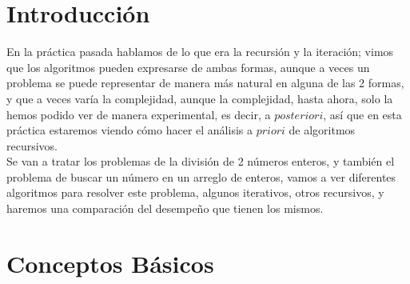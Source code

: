 \documentclass[12pt,twoside]{article}
\begin{document}
\section{Introducci\'on}
En la práctica pasada hablamos de lo que era la recursión y la iteración; vimos que los algoritmos pueden expresarse de ambas formas, aunque a veces un problema se puede representar de manera más natural en alguna de las 2 formas, y que a veces varía la complejidad, aunque la complejidad, hasta ahora, solo la hemos podido ver de manera experimental, es decir, a $posteriori$, así que en esta práctica estaremos viendo cómo hacer el análisis a $priori$ de algoritmos recursivos.
\\ Se van a tratar los problemas de la división de 2 números enteros, y también el problema de buscar un número en un arreglo de enteros, vamos a ver diferentes algoritmos para resolver este problema, algunos iterativos, otros recursivos, y haremos una comparación del desempeño que tienen los mismos.
\section{Conceptos B\'asicos}
\end{document}
